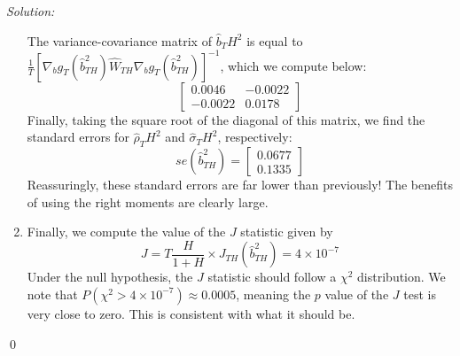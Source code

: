 \documentclass[12pt]{article}
\newenvironment{problem}[2][Problem]{\begin{trivlist}
\item[\hskip \labelsep {\bfseries #1}\hskip \labelsep {\bfseries #2.}]}{\end{trivlist}}
\newenvironment{sol}
    {\emph{Solution:}
    }
    {
    \qed
    }
\begin{document}
\begin{sol}
\begin{enumerate}[label=\alph*) ]
        The variance-covariance matrix of $\hat{b}_TH^2$ is equal to $\frac{1}{T}[\nabla_b g_T(\hat{b}_{TH}^2) \hat{W}_{TH} \nabla_b g_T(\hat{b}_{TH}^2)]^{-1}$, which we compute below:
        \[\begin{bmatrix} 0.0046 & -0.0022\\ -0.0022 & 0.0178\end{bmatrix}\]
        Finally, taking the square root of the diagonal of this matrix, we find the standard errors for $\hat{\rho}_TH^2$ and $\hat{\sigma}_TH^2$, respectively:
        \[se(\hat{b}_{TH}^2) = \begin{bmatrix} 0.0677\\ 0.1335\end{bmatrix}\]
        Reassuringly, these standard errors are far lower than previously! The benefits of using the right moments are clearly large.
        \item Finally, we compute the value of the $J$ statistic given by
        \[J = T \frac{H}{1 + H}\times J_{TH}(\hat{b}_{TH}^2) = 4 \times 10^{-7}\]
        Under the null hypothesis, the $J$ statistic should follow a $\chi^2$ distribution. We note that $P(\chi^2 > 4\times 10^{-7}) \approx 0.0005$, meaning the $p$ value of the $J$ test is very close to zero. This is consistent with what it should be.
    \end{enumerate}
\end{sol}
\begin{problem}{6}
\end{problem}
\end{document}
